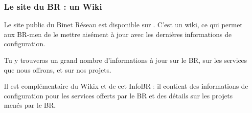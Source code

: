 
\subsubsection{Le site du BR : un Wiki}
\label{siteBR}

Le site public du Binet Réseau est disponible sur . C'est un wiki, ce qui permet aux BR-men de le mettre aisément
à jour avec les dernières informations de configuration.

Tu y trouveras un grand nombre d'informations à jour sur le BR, sur les services que nous offrons, et sur nos projets.

Il est complémentaire du Wikix et de cet InfoBR : il contient des informations de configuration pour les services offerts par le
BR et des détails sur les projets menés par le BR.
